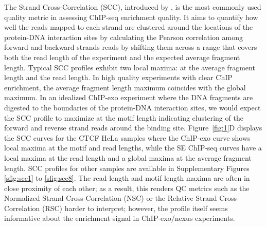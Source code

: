 \documentclass{bmcart}
\newcommand{\SK}[1]{\textcolor{red}{SK: #1}}
\newcommand{\RW}[1]{\textcolor{blue}{RW: #1}}
\begin{document}
The Strand Cross-Correlation (SCC), introduced by \cite{strandcc}, is the most commonly used quality metric in assessing ChIP-seq enrichment quality. It aims to quantify  how well the reads mapped to each strand are clustered around the locations of the protein-DNA interaction sites by calculating the Pearson correlation among forward and backward strands reads by shifting them across a range that covers both the read length of the experiment and the expected average fragment length. Typical SCC profiles exhibit two local maxima: at the average fragment length and the read length. In high quality experiments with clear ChIP enrichment, the average fragment length maximum coincides with the global maximum. In an idealized ChIP-exo experiment where the DNA fragments are digested to the boundaries of the protein-DNA interaction sites, we would expect the SCC profile to maximize at the motif length indicating clustering of the forward and reverse strand reads around the binding site. Figure~\ref{fig:1}D displays the SCC curves for the CTCF HeLa samples where the ChIP-exo curve shows local maxima at the motif and read lengths, while the SE ChIP-seq curves have a local maxima at the read length and a global maxima at the average fragment length. SCC profiles for other samples are available in Supplementary Figures \ref{sfig:scc1} to \ref{sfig:scc8}. The read length and motif length maxima are often in close proximity of each other; as a result, this renders QC metrics such as the Normalized Strand Cross-Correlation (NSC) or the Relative Strand Cross-Correlation (RSC) harder to interpret; however, the profile itself seems informative about the enrichment signal in ChIP-exo/nexus experiments. 
\end{document}
